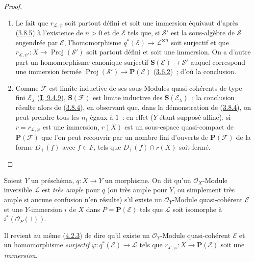 \begin{proof}
\begin{enumerate}
  \item[\rm{(i)}] Le fait que $r_{\mathcal{L},\psi}$ soit partout défini et
  soit une immersion équivaut d'après
  (\hyperref[II.3.8.5-fr]{3.8.5}) à l'existence de $n>0$ et de
  $\mathcal{E}$ tels que, si $\mathcal{S}'$ est la sous-algèbre de
  $\mathcal{S}$ engendrée par $\mathcal{E}$, l'homomorphisme
  $q^*(\mathcal{E})\to\mathcal{L}^{\otimes n}$ soit surjectif et que
  $r_{\mathcal{L},\psi'}:X\to\operatorname{Proj}(\mathcal{S}')$ soit partout
  défini et soit une immersion. On a d'autre part un homomorphisme canonique
  surjectif $\mathbf{S}(\mathcal{E})\to\mathcal{S}'$ auquel correspond une
  immersion fermée
  $\operatorname{Proj}(\mathcal{S}')\to\mathbf{P}(\mathcal{E})$
  (\hyperref[II.3.6.2-fr]{3.6.2})~; d'où la conclusion.
  \item[\rm{(ii)}] Comme $\mathcal{F}$ est limite inductive de ses
  sous-Modules quasi-cohérents de type fini $\mathcal{E}_\lambda$
  (\hyperref[I.9.4.9-fr]{\textbf{I}, 9.4.9}), $\mathbf{S}(\mathcal{F})$ est limite
  inductive des $\mathbf{S}(\mathcal{E}_\lambda)$~; la conclusion résulte
  alors de (\hyperref[II.3.8.4-fr]{3.8.4}), en observant que, dans la
  démonstration de (\hyperref[II.3.8.4-fr]{3.8.4}), on peut prendre tous les
  $n_i$ égaux à $1$~: en effet ($Y$ étant supposé affine), si
  $r=r_{\mathcal{L},\varphi}$ est une immersion, $r(X)$ est un sous-espace
  quasi-compact de $\mathbf{P}(\mathcal{F})$ que l'on peut recouvrir par un
  nombre fini d'ouverts de $\mathbf{P}(\mathcal{F})$ de la forme $D_+(f)$ avec
  $f\in F$, tels que $D_+(f)\cap r(X)$ soit fermé.
\end{enumerate}
\end{proof}

\begin{definition}[4.4.2]
\label{II.4.4.2-fr}
Soient $Y$ un préschéma, $q:X\to Y$ un morphisme. On dit qu'un
$\mathcal{O}_X$-Module inversible $\mathcal{L}$ est \emph{très ample} pour
$q$ \textup{(ou} très ample pour $Y$\textup{, ou simplement} très ample \textup{si
aucune confusion n'en résulte)} s'il existe un $\mathcal{O}_Y$-Module
quasi-cohérent $\mathcal{E}$ et une $Y$-immersion $i$ de $X$ dans
$P=\mathbf{P}(\mathcal{E})$ tels que $\mathcal{L}$ soit isomorphe à
$i^*(\mathcal{O}_P(1))$.
\end{definition}

Il revient au même (\hyperref[II.4.2.3-fr]{4.2.3}) de dire qu'il existe un
$\mathcal{O}_Y$-Module quasi-cohérent $\mathcal{E}$ et un homomorphisme
\emph{surjectif} $\varphi:q^*(\mathcal{E})\to\mathcal{L}$ tels que
$r_{\mathcal{L},\varphi}:X\to\mathbf{P}(\mathcal{E})$ soit une \emph{immersion}.

